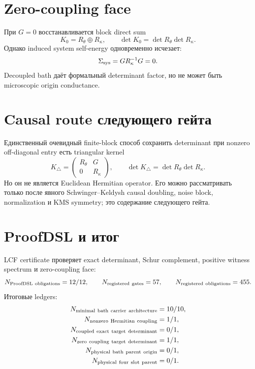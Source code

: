 \section{Zero-coupling face}

При $G=0$ восстанавливается block direct sum
\begin{equation}
 K_0=R_\theta\oplus R_\kappa,
 \qquad
 \det K_0=\det R_\theta\det R_\kappa.
 \label{eq:v9-kms-fermion-bath-zero-face}
\end{equation}
Однако induced system self-energy одновременно исчезает:
\begin{equation}
 \Sigma_{\rm sys}=GR_\kappa^{-1}G=0.
 \label{eq:v9-kms-fermion-bath-zero-self-energy}
\end{equation}
Decoupled bath даёт формальный determinant factor, но не может быть
microscopic origin conductance.

\section{Causal route следующего гейта}

Единственный очевидный finite-block способ сохранить determinant при
nonzero off-diagonal entry есть triangular kernel
\begin{equation}
 K_{\triangle}=\begin{pmatrix}R_\theta&G\\0&R_\kappa\end{pmatrix},
 \qquad \det K_{\triangle}=\det R_\theta\det R_\kappa.
 \label{eq:v9-kms-fermion-bath-triangular-candidate}
\end{equation}
Но он не является Euclidean Hermitian operator. Его можно рассматривать
только после явного Schwinger--Keldysh causal doubling, noise block,
normalization и KMS symmetry; это содержание следующего гейта.

\section{ProofDSL и итог}

LCF certificate проверяет exact determinant, Schur complement, positive
witness spectrum и zero-coupling face:
\begin{equation}
 N_{\rm ProofDSL\ obligations}=12/12,
 \qquad N_{\rm registered\ gates}=57,
 \qquad N_{\rm registered\ obligations}=455.
 \label{eq:v9-kms-fermion-bath-proofdsl}
\end{equation}
Итоговые ledgers:
\begin{equation}
 \begin{aligned}
 N_{\rm minimal\ bath\ carrier\ architecture}&=10/10,\\
 N_{\rm nonzero\ Hermitian\ coupling}&=1/1,\\
 N_{\rm coupled\ exact\ target\ determinant}&=0/1,\\
 N_{\rm zero\ coupling\ target\ determinant}&=1/1,\\
 N_{\rm physical\ bath\ parent\ origin}&=0/1,\\
 N_{\rm physical\ four\ slot\ parent}&=0/1.
 \end{aligned}
 \label{eq:v9-kms-fermion-bath-ledger}
\end{equation}

